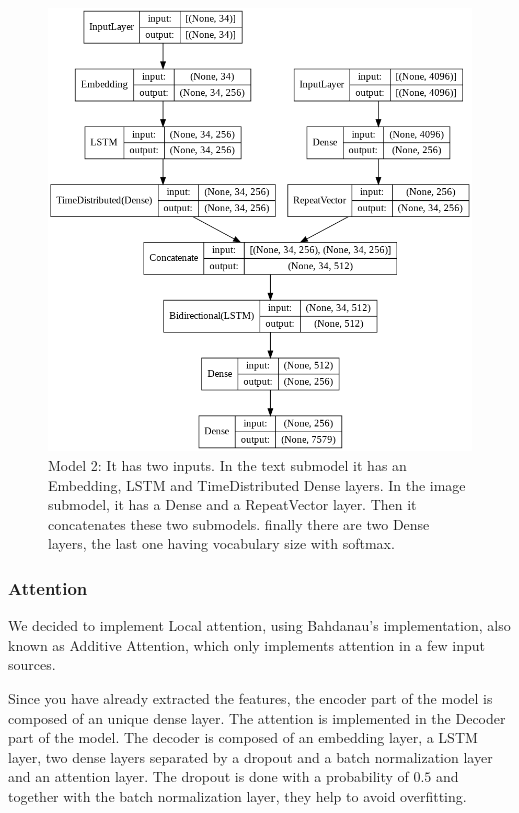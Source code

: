 \documentclass{article} %
\begin{document}
\begin{figure}[ht]
\includegraphics[width=\textwidth]{rnn_model_2_vgg16.png}
\caption{Model 2: It has two inputs. In the text submodel it has an Embedding, LSTM and TimeDistributed Dense layers. In the image submodel, it has a Dense and a RepeatVector layer. Then it concatenates these two submodels. finally there are two Dense layers, the last one having vocabulary size with softmax.}
\label{Model2}
\end{figure}

\subsubsection{Attention}

We decided to implement Local attention, using Bahdanau's implementation, also known as Additive Attention, which only implements attention in a few input sources.

Since you have already extracted the features, the encoder part of the model is composed of an unique dense layer. The attention is implemented in the Decoder part of the model. The decoder is composed of an embedding layer, a LSTM layer, two dense layers separated by a dropout and a batch normalization layer and an attention layer. The dropout is done with a probability of $0.5$ and together with the batch normalization layer, they help to avoid overfitting.
\end{document}
